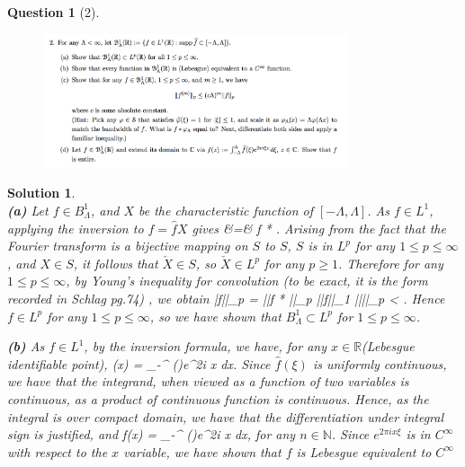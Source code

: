 \documentclass{article} %
\def\eQb#1\eQe{\begin{eqnarray*}#1\end{eqnarray*}}
\theoremstyle{quest}
\newtheorem*{question}{Question}
\newtheorem*{solution}{Solution}
\begin{document}
\begin{question}[2]
\hfill
\begin{figure}[h!]
  \centering
    \includegraphics[width=0.8\textwidth]{HA-5-2.png}
\end{figure}
\end{question}
\begin{solution} \hfill \\
\textbf{(a)}
Let $f \in B^{1}_{\Lambda}$, and
$X$ be the characteristic function of $[-\Lambda, \Lambda]$. As $f \in L^{1}$, applying 
the inversion to $\hat{f} = \hat{f}X$ gives
\eQb
f &=& f * . 
\eQe
Arising from the fact that the Fourier transform is a bijective mapping on $S$ to $S$,
$S$ is in $L^p$ for any $1 \leq p \leq \infty$, and $X \in S$, 
it follows that $\check{X} \in S$, so $\check{X} \in L^p$ for any $p \geq 1$.
Therefore for any $1 \leq p \leq \infty$, by Young's inequality for convolution (to be exact, it
is the form recorded in Schlag pg.74) , we obtain
\eQb
||f||_{p} = ||f * ||_{p} \leq ||f||_{1} ||||_{p} < \infty.
\eQe
Hence $f \in L^p$ for any $1 \leq p \leq \infty$, so we have shown that $B^1_{\Lambda} \subset 
L^p$ for $1 \leq p \leq \infty$.

\bigskip

\textbf{(b)} 
As $f \in L^1$, by the inversion formula, we have, for any $x \in \mathbb{R}$(Lebesgue identifiable point),
\eQb
f(x) = \int_{-\Lambda}^{\Lambda} (\xi)e^{2\pi i x \xi } dx.
\eQe
Since $\hat{f}(\xi)$ is uniformly continuous, we have that the integrand, when viewed as a function of 
two variables is continuous, as a product of continuous function is continuous. Hence, as the
integral is over compact domain, we have
that the differentiation under integral sign is justified, and
\eQb
\dfrac{d^n}{dx} f(x) = \int_{-\Lambda}^{\Lambda}  (\xi)e^{2\pi i x \xi } dx,
\eQe
for any $n \in \mathbb{N}$. Since $e^{2\pi i x \xi}$ is in $C^{\infty}$ with respect to the $x$ 
variable, we have shown that $f$ is Lebesgue equivalent to $C^{\infty}$


\end{solution}
\end{document}
